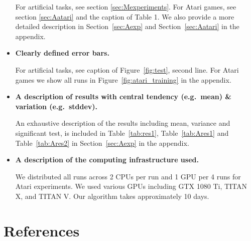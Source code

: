 \documentclass{article}
\begin{document}
\begin{appendices}
\begin{itemize}
For artificial tasks, see section \ref{sec:Mexperiments}.
For Atari games, see section \ref{sec:Aatari} and the caption of Table 1. 
We also provide a more detailed description in Section~\ref{sec:Aexp} and Section~\ref{sec:Aatari} in the appendix.
    \item \textbf{Clearly defined error bars.}
    
For artificial tasks, see caption of Figure~\ref{fig:test}, second line.
For Atari games we show all runs in Figure~\ref{fig:atari_training} in the appendix.
    \item \textbf{A description of results with central tendency (e.g.\ mean) \& variation (e.g.\ stddev).}
    
An exhaustive description of the results including mean, variance and significant test, is included in Table~\ref{tab:res1}, Table~\ref{tab:Ares1} and Table~\ref{tab:Ares2} in Section~\ref{sec:Aexp} in the appendix.
    \item \textbf{A description of the computing infrastructure used.}
    
We distributed all runs across 2 CPUs per run and 1 GPU per 4 runs for Atari experiments. We used various GPUs including GTX 1080 Ti, TITAN X, and TITAN V.
Our algorithm takes approximately 10 days.
\end{itemize}

\vfill
\pagebreak
\section{References}
\label{sec:Areferences}
\renewcommand{\section}[2]{}






\end{appendices}
\end{document}
